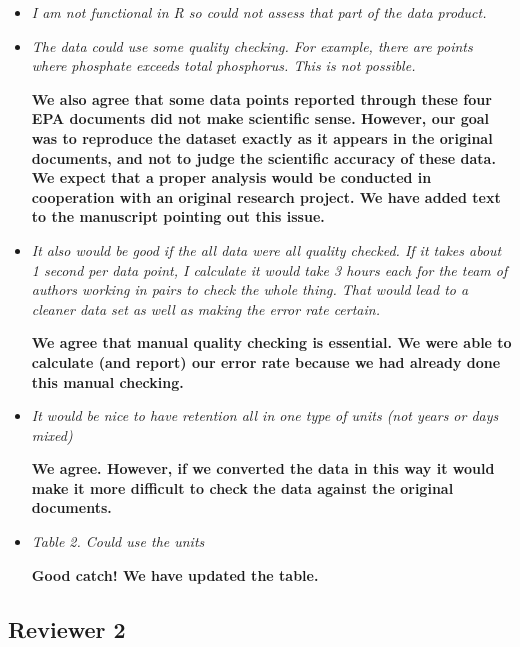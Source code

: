 \documentclass{article}
\begin{document}
\begin{itemize}
    \item \emph{I am not functional in R so could not assess that part of the data product.}

    \item \emph{The data could use some quality checking. For example, there are points where phosphate exceeds total phosphorus. This is not possible.}

\textbf{We also agree that some data points reported through these four EPA documents did not make scientific sense.  However, our goal was to reproduce the dataset exactly as it appears in the original documents, and not to judge the scientific accuracy of these data.  We expect that a proper analysis would be conducted in cooperation with an original research project. We have added text to the manuscript pointing out this issue.}

    \item \emph{It also would be good if the all data were all quality checked. If it takes about 1 second per data point, I calculate it would take 3 hours each for the team of authors working in pairs to check the whole thing. That would lead to a cleaner data set as well as making the error rate certain.}

\textbf{We agree that manual quality checking is essential. We were able to calculate (and report) our error rate because we had already done this manual checking.}

    \item \emph{It would be nice to have retention all in one type of units (not years or days mixed)}

\textbf{We agree. However, if we converted the data in this way it would make it more difficult to check the data against the original documents.}

    \item \emph{Table 2. Could use the units}

\textbf{Good catch! We have updated the table.}

\end{itemize}

\subsection{Reviewer 2}
\end{document}
